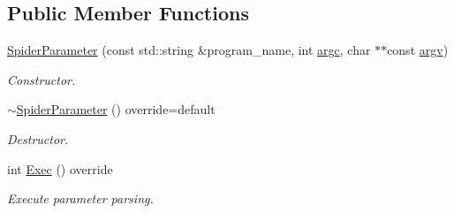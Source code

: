 \subsection*{Public Member Functions}
\begin{DoxyCompactItemize}
\item 
\hyperlink{classSpiderParameter_a8f2a2611394148686abf3eda7fcfec8f}{Spider\+Parameter} (const std\+::string \&program\+\_\+name, int \hyperlink{classParameter_a76b21c2ed27f73883401229217020814}{argc}, char $\ast$$\ast$const \hyperlink{classParameter_a538da2e132ca91996baa116097d6238f}{argv})
\begin{DoxyCompactList}\small\item\em Constructor. \end{DoxyCompactList}\item 
\hyperlink{classSpiderParameter_ad4c9432a9468e4c331232aa9204188fc}{$\sim$\+Spider\+Parameter} () override=default
\begin{DoxyCompactList}\small\item\em Destructor. \end{DoxyCompactList}\item 
int \hyperlink{classSpiderParameter_a88ccb6e00f3a60b59e6ecb82e3f1b76d}{Exec} () override
\begin{DoxyCompactList}\small\item\em Execute parameter parsing. \end{DoxyCompactList}\end{DoxyCompactItemize}
